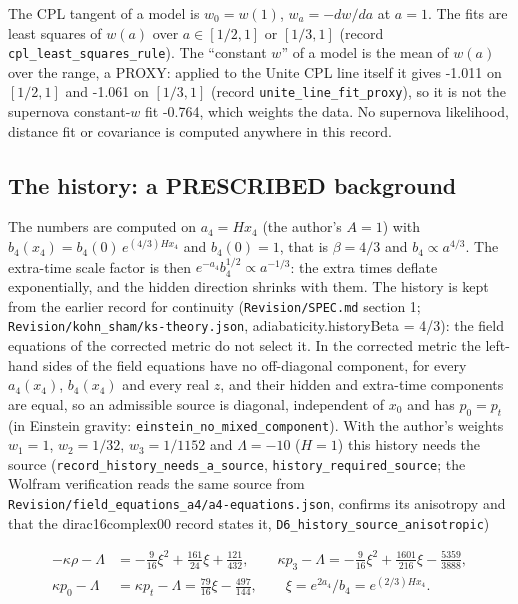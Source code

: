\documentclass[11pt]{article}
\begin{document}
The CPL tangent of a model is $w_0 = w(1)$, $w_a = -dw/da$ at $a = 1$. The fits are least squares of $w(a)$ over $a \in [1/2, 1]$ or $[1/3, 1]$ (record \texttt{cpl\_leas\allowbreak{}t\_square\allowbreak{}s\_rule}). The ``constant $w$'' of a model is the mean of $w(a)$ over the range, a PROXY: applied to the Unite CPL line itself it gives -1.011 on $[1/2, 1]$ and -1.061 on $[1/3, 1]$ (record \texttt{unite\_li\allowbreak{}ne\_fit\_p\allowbreak{}roxy}), so it is not the supernova constant-$w$ fit -0.764, which weights the data. No supernova likelihood, distance fit or covariance is computed anywhere in this record.

\subsection{The history: a PRESCRIBED background}

The numbers are computed on $a_4 = Hx_4$ (the author's $A = 1$) with $b_4(x_4) = b_4(0)\,e^{(4/3)Hx_4}$ and $b_4(0) = 1$, that is $\beta = 4/3$ and $b_4 \propto a^{4/3}$. The extra-time scale factor is then $e^{-a_4}b_4^{1/2} \propto a^{-1/3}$: the extra times deflate exponentially, and the hidden direction shrinks with them. The history is kept from the earlier record for continuity (\texttt{Revision\allowbreak{}/SPEC.md} section 1; \texttt{Revision\allowbreak{}/kohn\_sh\allowbreak{}am/ks-th\allowbreak{}eory.jso\allowbreak{}n}, adiabaticity.historyBeta = 4/3): the field equations of the corrected metric do not select it. In the corrected metric the left-hand sides of the field equations have no off-diagonal component, for every $a_4(x_4)$, $b_4(x_4)$ and every real $z$, and their hidden and extra-time components are equal, so an admissible source is diagonal, independent of $x_0$ and has $p_0 = p_t$ (in Einstein gravity: \texttt{einstein\allowbreak{}\_no\_mixe\allowbreak{}d\_compon\allowbreak{}ent}). With the author's weights $w_1 = 1$, $w_2 = 1/32$, $w_3 = 1/1152$ and $\Lambda = -10$ ($H = 1$) this history needs the source (\texttt{record\_h\allowbreak{}istory\_n\allowbreak{}eeds\_a\_s\allowbreak{}ource}, \texttt{history\_\allowbreak{}required\allowbreak{}\_source}; the Wolfram verification reads the same source from \texttt{Revision\allowbreak{}/field\_e\allowbreak{}quations\allowbreak{}\_a4/a4-e\allowbreak{}quations\allowbreak{}.json}, confirms its anisotropy and that the dirac16complex00 record states it, \texttt{D6\_histo\allowbreak{}ry\_sourc\allowbreak{}e\_anisot\allowbreak{}ropic})

\[
\begin{aligned}
-\kappa\rho - \Lambda &= -\tfrac{9}{16}\xi^2 + \tfrac{161}{24}\xi + \tfrac{121}{432} ,\qquad
\kappa p_3 - \Lambda = -\tfrac{9}{16}\xi^2 + \tfrac{1601}{216}\xi - \tfrac{5359}{3888} ,\\
\kappa p_0 - \Lambda &= \kappa p_t - \Lambda = \tfrac{79}{16}\xi - \tfrac{497}{144} ,\qquad \xi = e^{2a_4}/b_4 = e^{(2/3)Hx_4} .
\end{aligned}
\]
\end{document}
